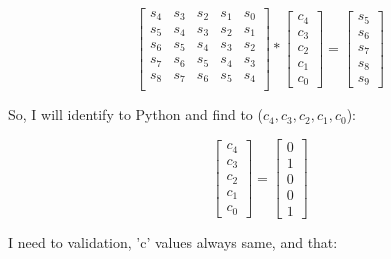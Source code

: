 \documentclass[a4paper, 11pt]{article}
\begin{document}
\begin{center}
  \begin{equation*}
     \begin{bmatrix}
      s_{4} & s_{3} & s_{2} & s_{1} & s_{0}\\
      s_{5} & s_{4} & s_{3} & s_{2} & s_{1}\\
      s_{6} & s_{5} & s_{4} & s_{3} & s_{2}\\
      s_{7} & s_{6} & s_{5} & s_{4} & s_{3}\\
      s_{8} & s_{7} & s_{6} & s_{5} & s_{4}\\
    \end{bmatrix} 
    *
    \begin{bmatrix}
      c_{4}\\  c_{3}\\  c_{2}\\ c_{1}\\  c_{0}
    \end{bmatrix}
    =
    \begin{bmatrix}
      s_{5}\\  s_{6}\\  s_{7}\\ s_{8}\\  s_{9}
    \end{bmatrix}
  \end{equation*}
\end{center}


 So, I will identify to Python and find to ($c_{4}, c_{3}, c_{2}, c_{1}, c_{0} $):

\begin{center}
  \begin{equation*}
    \begin{bmatrix}
      c_{4}\\  c_{3}\\  c_{2}\\ c_{1}\\  c_{0}
    \end{bmatrix}
    =
    \begin{bmatrix}
     0\\  1\\  0\\ 0\\  1
    \end{bmatrix}
  \end{equation*}
\end{center}

I need to validation, 'c' values always same, and that:
\end{document}
